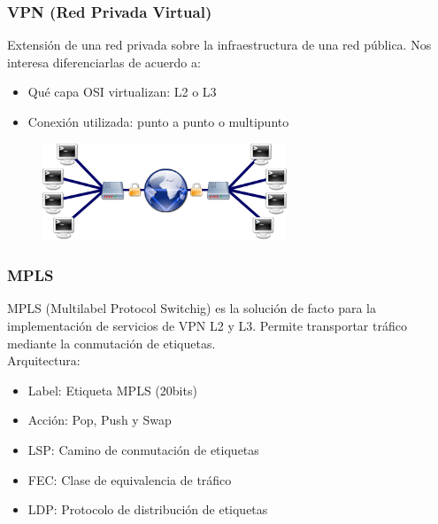\documentclass{beamer}
\begin{document}
\begin{frame}
\frametitle{VPN (Red Privada Virtual)} 
Extensión de una red privada sobre la infraestructura de una red pública. Nos interesa diferenciarlas de acuerdo a:
\begin{itemize}
\item Qu\'e capa OSI virtualizan: L2 o L3
\item Conexi\'on utilizada: punto a punto o multipunto
\end{itemize}
	
\vspace{0.4cm}
\begin{figure}[H]
\centering
\includegraphics[width=0.65\textwidth]{imagenes/vpn.png}
\end{figure}

\end{frame}

\begin{frame}
\frametitle{MPLS} 

MPLS (Multilabel Protocol Switchig) es la soluci\'on de facto para la implementaci\'on de servicios de VPN L2 y L3. Permite transportar tr\'afico mediante la conmutaci\'on de etiquetas.\\

\vspace{0.4cm}
\pause
Arquitectura:\\

\begin{itemize}
\item Label: Etiqueta MPLS (20bits)
\item Acci\'on: Pop, Push y Swap
\item LSP: Camino de conmutaci\'on de etiquetas
\item FEC: Clase de equivalencia de tr\'afico
\item LDP: Protocolo de distribución de etiquetas
\end{itemize}

\end{frame}
\end{document}

